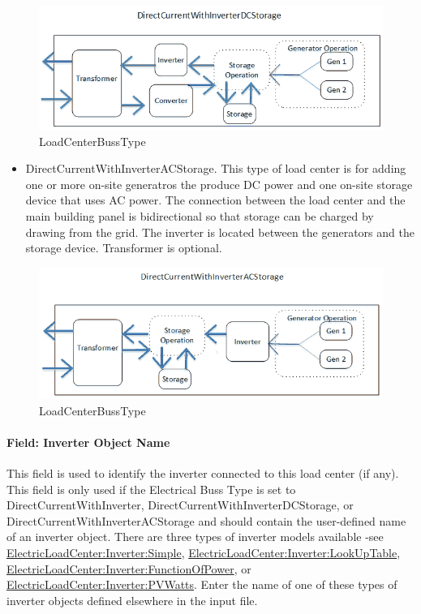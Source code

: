 \begin{figure}[htbp]
\centering
\includegraphics{media/DCInverterWithDCStorageBussDiagram.png}
\caption{LoadCenterBussType}
\end{figure}

\begin{itemize}
\tightlist
\item
  DirectCurrentWithInverterACStorage. This type of load center is for adding one or more on-site generatros the produce DC power and one on-site storage device that uses AC power. The connection between the load center and the main building panel is bidirectional so that storage can be charged by drawing from the grid. The inverter is located between the generators and the storage device. Transformer is optional.
\end{itemize}

\begin{figure}[htbp]
\centering
\includegraphics{media/DCInverterWithACStorageBussDiagram.png}
\caption{LoadCenterBussType}
\end{figure}

\paragraph{Field: Inverter Object Name}\label{field-inverter-object-name}

This field is used to identify the inverter connected to this load center (if any). This field is only used if the Electrical Buss Type is set to DirectCurrentWithInverter, DirectCurrentWithInverterDCStorage, or DirectCurrentWithInverterACStorage and should contain the user-defined name of an inverter object. There are three types of inverter models available -see \hyperref[electricloadcenterinvertersimple]{ElectricLoadCenter:Inverter:Simple}, \hyperref[electricloadcenterinverterlookuptable]{ElectricLoadCenter:Inverter:LookUpTable}, \hyperref[electricloadcenterinverterfunctionofpower]{ElectricLoadCenter:Inverter:FunctionOfPower}, or \hyperref[electricloadcenterinverterpvwatts]{ElectricLoadCenter:Inverter:PVWatts}. Enter the name of one of these types of inverter objects defined elsewhere in the input file.

